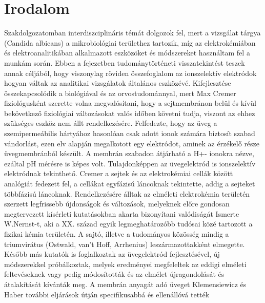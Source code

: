 \chapter{Irodalom}
Szakdolgozatomban interdiszciplináris témát dolgozok fel, mert a vizsgálat tárgya (Candida albicans) a mikrobiológiai területhez tartozik, míg az elektrokémiában és elektroanalitikában   alkalmazott eszközöket és módszereket használtam fel a munkám során.
Ebben a fejezetben tudománytörténeti visszatekintést teszek annak céljából, hogy viszonylag röviden összefoglalom az ionszelektív elektródok hogyan váltak az analitikai vizsgálatok általános eszközévé. Kifejlesztése összekapcsolódik a biológiával és az orvostudománnyal, mert Max Cremer fiziológusként szerette volna megvalósítani, hogy a sejtmembránon belül és kívül bekövetkező fiziológiai változásokat valós időben követni tudja, viszont az ehhez szükséges eszköz nem állt rendelkezésére.  Felfedezte, hogy az üveg a szemipermeábilis hártyához hasonlóan csak adott ionok számára biztosít szabad vándorlást, ezen elv alapján megalkotott egy elektródot, aminek az érzékelő része üvegmembránból készült. A membrán szabadon átjárható a H+- ionokra nézve, ezáltal pH mérésre is képes volt. Tulajdonképpen az üvegelektród is ionszelektív elektródnak tekinthető. Cremer a sejtek és az elektrokémiai cellák között analógiát fedezett fel, a cellákat egyfázisú láncoknak tekintette, addig a sejteket többfázisú láncoknak.  Rendelkezésére álltak az elméleti elektrokémia területén szerzett legfrissebb újdonságok és változások, melyeknek előre gondosan megtervezett kísérleti kutatásokban akarta bizonyítani valódiságát  Ismerte W.Nernst-t, aki a XX. század egyik legmeghatározóbb tudósai közé tartozott a fizikai kémia területén. A sajtó, illetve a tudományos közösség mindig a triumvirátus (Ostwald, van’t Hoff, Arrhenius) leszármazottakként elmegette.  Később más kutatók is foglalkoztak az üvegelektród fejlesztésével, új módszerekkel próbálkoztak, melyek eredményei megfeleltek az eddigi elméleti feltevéseknek vagy pedig módosították és az elmélet újragondolását és átalakítását kívánták meg.  A membrán anyagát adó üveget Klemensiewicz és Haber további eljárások útján specifikusabbá és ellenállóvá tették 
